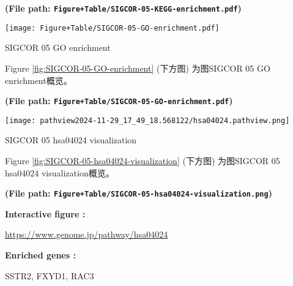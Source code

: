\documentclass[
]{article}
\begin{document}
\textbf{(File path: \texttt{Figure+Table/SIGCOR-05-KEGG-enrichment.pdf})}

\begin{center}\vspace{1.5cm}\end{center}

\begin{center}\vspace{1.5cm}\end{center}
\def\@captype{figure}
\begin{center}
\texttt{[image: Figure+Table/SIGCOR-05-GO-enrichment.pdf]}
\caption{SIGCOR 05 GO enrichment}\label{fig:SIGCOR-05-GO-enrichment}
\end{center}

Figure \ref{fig:SIGCOR-05-GO-enrichment} (下方图) 为图SIGCOR 05 GO enrichment概览。

\textbf{(File path: \texttt{Figure+Table/SIGCOR-05-GO-enrichment.pdf})}

\begin{center}\vspace{1.5cm}\end{center}

\begin{center}\vspace{1.5cm}\end{center}
\def\@captype{figure}
\begin{center}
\texttt{[image: pathview2024-11-29\_17\_49\_18.568122/hsa04024.pathview.png]}
\caption{SIGCOR 05 hsa04024 visualization}\label{fig:SIGCOR-05-hsa04024-visualization}
\end{center}

Figure \ref{fig:SIGCOR-05-hsa04024-visualization} (下方图) 为图SIGCOR 05 hsa04024 visualization概览。

\textbf{(File path: \texttt{Figure+Table/SIGCOR-05-hsa04024-visualization.png})}

\begin{center}\begin{tcolorbox}[colback=gray!10, colframe=gray!50, width=0.9\linewidth, arc=1mm, boxrule=0.5pt]
\textbf{
Interactive figure
:}

\vspace{0.5em}

    \url{https://www.genome.jp/pathway/hsa04024}

\vspace{2em}


\textbf{
Enriched genes
:}

\vspace{0.5em}

    SSTR2, FXYD1, RAC3

\vspace{2em}
\end{tcolorbox}
\end{center}
\end{document}
